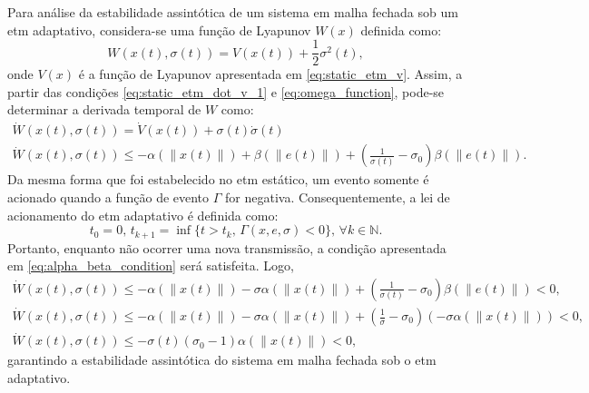 Para análise da estabilidade assintótica de um sistema em malha fechada sob um \acrshort{etm} adaptativo, considera-se uma função de Lyapunov $W(x)$ definida como: \begin{equation}
  W(x(t), \sigma(t)) = V(x(t)) + \frac{1}{2}\sigma^2(t),
\end{equation} onde $V(x)$ é a função de Lyapunov apresentada em \eqref{eq:static_etm_v}. Assim, a partir das condições \eqref{eq:static_etm_dot_v_1} e \eqref{eq:omega_function}, pode-se determinar a derivada temporal de $W$ como: \begin{gather}
  \dot{W}(x(t), \sigma(t)) = \dot{V}(x(t)) + \sigma(t) \dot{\sigma}(t) \\[8pt]
  \dot{W}(x(t), \sigma(t)) \leq - \alpha(\|x(t)\|) + \beta(\|e(t)\|) + \left(\frac{1}{\sigma(t)} - \sigma_0\right)\beta(\|e(t)\|).
\end{gather} Da mesma forma que foi estabelecido no \acrshort{etm} estático, um evento somente é acionado quando a função de evento $\Gamma$ for negativa. Consequentemente, a lei de acionamento do \acrshort{etm} adaptativo é definida como: \begin{equation}
  t_0 = 0, \, t_{k+1} = \inf\{t > t_k, \, \Gamma(x, e, \sigma) < 0\}, \, \forall k \in \mathbb{N}. \label{eq:adaptative_event_triggering_law}
\end{equation} Portanto, enquanto não ocorrer uma nova transmissão, a condição apresentada em \eqref{eq:alpha_beta_condition} será satisfeita. Logo, \begin{gather}
  \dot{W}(x(t), \sigma(t)) \leq - \alpha(\|x(t)\|) - \sigma \alpha(\|x(t)\|) + \left(\frac{1}{\sigma(t)} - \sigma_0\right)\beta(\|e(t)\|) < 0, \\[8pt]
  \dot{W}(x(t), \sigma(t)) \leq - \alpha(\|x(t)\|) - \sigma \alpha(\|x(t)\|) + \left(\frac{1}{\sigma} - \sigma_0\right) (- \sigma \alpha(\|x(t)\|)) < 0, \\[8pt]
  \dot{W}(x(t), \sigma(t)) \leq - \sigma(t)(\sigma_0 - 1) \alpha(\|x(t)\|) < 0,
\end{gather} garantindo a estabilidade assintótica do sistema em malha fechada sob o \acrshort{etm} adaptativo.

